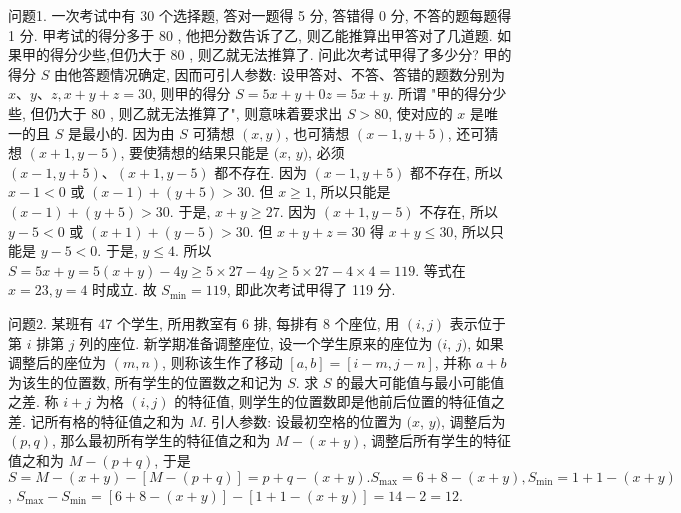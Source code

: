 
问题1. 一次考试中有 30 个选择题, 答对一题得 5 分, 答错得 0 分, 不答的题每题得 1 分.
甲考试的得分多于 80 , 他把分数告诉了乙, 则乙能推算出甲答对了几道题.
如果甲的得分少些,但仍大于 80 , 则乙就无法推算了.
问此次考试甲得了多少分?
甲的得分 $S$ 由他答题情况确定, 因而可引人参数: 设甲答对、不答、答错的题数分别为 $x 、 y 、 z, x+y+z=30$, 则甲的得分 $S=5 x+y+0 z= 5 x+y$. 所谓 "甲的得分少些, 但仍大于 80 , 则乙就无法推算了", 则意味着要求出 $S>80$, 使对应的 $x$ 是唯一的且 $S$ 是最小的.
因为由 $S$ 可猜想 $(x, y)$, 也可猜想 $(x-1, y+5)$, 还可猜想 $(x+1, y-5)$, 要使猜想的结果只能是 $(x$, $y)$, 必须 $(x-1, y+5) 、(x+1, y-5)$ 都不存在.
因为 $(x-1, y+5)$ 都不存在, 所以 $x-1<0$ 或 $(x-1)+(y+5)>30$. 但 $x \geqslant 1$, 所以只能是 $(x-1)+(y+5)>30$. 于是, $x+y \geqslant 27$. 因为 $(x+1, y-5)$ 不存在, 所以 $y-5<0$ 或 $(x+1)+(y-5)>30$. 但 $x+y+z=30$ 得 $x+y \leqslant 30$, 所以只能是 $y- 5<0$. 于是, $y \leqslant 4$. 所以 $S=5 x+y=5(x+y)-4 y \geqslant 5 \times 27-4 y \geqslant 5 \times 27-4 \times 4=119$. 等式在 $x=23, y=4$ 时成立.
故 $S_{\min }=119$, 即此次考试甲得了 119 分.



问题2. 某班有 47 个学生, 所用教室有 6 排, 每排有 8 个座位, 用 $(i, j)$ 表示位于第 $i$ 排第 $j$ 列的座位.
新学期准备调整座位, 设一个学生原来的座位为 $(i$, $j)$, 如果调整后的座位为 $(m, n)$, 则称该生作了移动 $[a, b]=[i-m, j- n]$, 并称 $a+b$ 为该生的位置数, 所有学生的位置数之和记为 $S$. 求 $S$ 的最大可能值与最小可能值之差.
称 $i+j$ 为格 $(i, j)$ 的特征值, 则学生的位置数即是他前后位置的特征值之差.
记所有格的特征值之和为 $M$. 引人参数: 设最初空格的位置为 $(x$, $y)$, 调整后为 $(p, q)$, 那么最初所有学生的特征值之和为 $M-(x+y)$, 调整后所有学生的特征值之和为 $M-(p+q)$, 于是 $S=M-(x+y)-[M-(p+ q)]=p+q-(x+y) . S_{\max }=6+8-(x+y), S_{\min }=1+1-(x+y)$, $S_{\max }-S_{\min }=[6+8-(x+y)]-[1+1-(x+y)]=14-2=12$.



